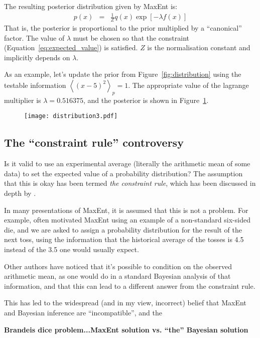 \documentclass[a4paper, 11pt]{article}
\begin{document}
The resulting posterior distribution given by MaxEnt is:
\begin{eqnarray}
p(x) &=& \frac{1}{Z}q(x)\exp\left[-\lambda f(x)\right] 
\end{eqnarray}
That is, the posterior is proportional to the prior multiplied by a
``canonical'' factor. The value of $\lambda$ must be chosen so that
the constraint (Equation~\ref{eq:expected_value}) is satisfied. $Z$ is the
normalisation constant and implicitly depends on $\lambda$.

As an example, let's update the prior from Figure~\ref{fig:distribution}
using the testable information $\left<(x - 5)^2\right>_p = 1$. The appropriate
value of the lagrange multiplier is $\lambda=0.516375$, and the posterior is
shown in Figure~\ref{fig:distribution3}.
\begin{figure}
\begin{center}
\texttt{[image: distribution3.pdf]}
\caption{\label{fig:distribution3}}
\end{center}
\end{figure}


\subsection{The ``constraint rule'' controversy}
Is it valid to use an experimental average (literally the arithmetic mean of
some data) to set the expected value of a probability distribution? The
assumption that this is okay has been termed {\it the constraint rule}, which
has been discussed in depth by \citet{uffink}.

In many presentations of MaxEnt, it is assumed that this is not a problem.
For example, \citet{jaynes} often motivated MaxEnt using an example of a
non-standard six-sided die, and we are asked to assign a probability
distribution for the result of the next toss, using the information that the
historical average of the tosses is 4.5 instead of the 3.5 one would
usually expect.


Other authors have noticed that it's possible to
condition on the observed arithmetic mean, as one would do in a standard
Bayesian analysis of that information, and that this can lead to a different
answer from the constraint rule.


This has led to the widespread (and in my view, incorrect) belief that
MaxEnt and Bayesian inference are ``incompatible'', and the 

{\bf Brandeis dice problem...MaxEnt solution vs. ``the'' Bayesian solution}
\end{document}
